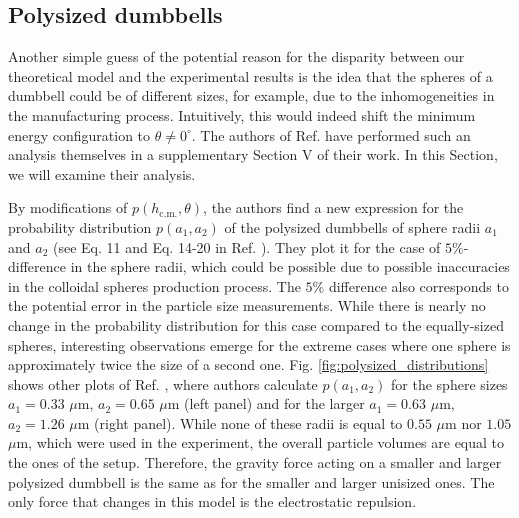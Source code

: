 \documentclass{master_thesis}
\begin{document}
\subsection{Polysized dumbbells}

Another simple guess of the potential reason for the disparity between our theoretical model and the experimental results is the idea that the spheres of a dumbbell could be of different sizes, for example, due to the inhomogeneities in the manufacturing process. Intuitively, this would indeed shift the minimum energy configuration to $\theta \neq 0^{\circ}$. The authors of Ref. \cite{verweij2021} have performed such an analysis themselves in a supplementary Section V of their work. In this Section, we will examine their analysis.

By modifications of $p(h_{\textrm{c.m.}},\theta)$, the authors find a new expression for the probability distribution $p(a_1,a_2)$ of the polysized dumbbells of sphere radii $a_1$ and $a_2$ (see Eq. 11 and Eq. 14-20 in Ref. \cite{verweij2021}). They plot it for the case of $5\%$-difference in the sphere radii, which could be possible due to possible inaccuracies in the colloidal spheres production process. The $ 5\%$ difference also corresponds to the potential error in the particle size measurements. While there is nearly no change in the probability distribution for this case compared to the equally-sized spheres, interesting observations emerge for the extreme cases where one sphere is approximately twice the size of a second one. Fig. \ref{fig:polysized_distributions} shows other plots of Ref. \cite{verweij2021}, where authors calculate $p(a_1, a_2)$ for the sphere sizes $a_1=0.33$ $\mu$m, $a_2=0.65$ $\mu$m (left panel) and for the larger $a_1=0.63$ $\mu$m, $a_2=1.26$ $\mu$m (right panel). While none of these radii is equal to $0.55$ $\mu$m nor $1.05$ $\mu$m, which were used in the experiment, the overall particle volumes are equal to the ones of the setup. Therefore, the gravity force acting on a smaller and larger polysized dumbbell is the same as for the smaller and larger unisized ones. The only force that changes in this model is the electrostatic repulsion.
\end{document}
